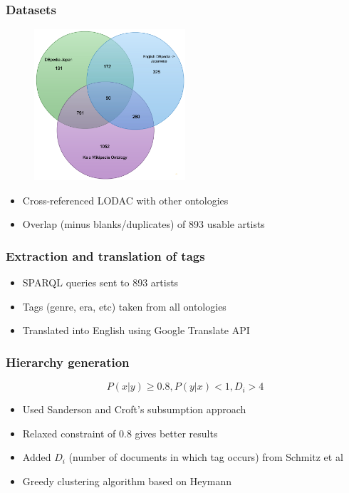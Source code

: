 \documentclass{beamer}
\begin{document}
\begin{frame}
    \frametitle{Datasets}
    \begin{figure}
        \centering
        \includegraphics[width=0.5\textwidth]{venn.png}
    \end{figure}
        \begin{itemize}
            \item Cross-referenced LODAC with other ontologies
            \item Overlap (minus blanks/duplicates) of 893 usable artists
        \end{itemize}
\end{frame}

\begin{frame}
    \frametitle{Extraction and translation of tags}
        \begin{itemize}
          \item SPARQL queries sent to 893 artists
            \item Tags (genre, era, etc) taken from all ontologies
            \item Translated into English using Google Translate API
        \end{itemize}
\end{frame}

\begin{frame}
    \frametitle{Hierarchy generation}
            \[P(x|y) \geq 0.8, P(y|x) < 1, D_i > 4\]
        \begin{itemize}
            \item Used Sanderson and Croft's subsumption approach \cite{sanderson}
            \item Relaxed constraint of 0.8 gives better results
            \item Added $D_i$ (number of documents in which tag occurs) from Schmitz et al \cite{schmitz}
            \item Greedy clustering algorithm based on Heymann \cite{heymann}
        \end{itemize}
\end{frame}
\end{document}
